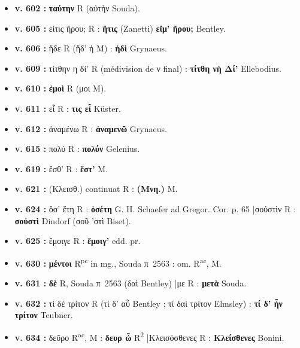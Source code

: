 \documentclass[10pt, a4paper, twoside]{book}
\renewcommand{\_}{\origunderscore\penalty0\relax}
\providecommand{\lecon}[1]{\textbf{#1}}
\providecommand{\expo}[1]{\textsuperscript{#1}}
\providecommand{\Rac}{R\expo{ac}}
\providecommand{\Rpc}{R\expo{pc}}
\providecommand{\Rdeux}{R\expo{2}}
\providecommand{\Mon}{M}
\providecommand{\espApp}{\hspace{0.5em}|\hspace{0.5em}}
\begin{document}
\begin{itemize}
\begin{itemize}
    \item \textbf{v. 602 :} \lecon{ταύτην} R (αὐτὴν Souda).
    \item \textbf{v. 605 :} εἰτις ἤρου; R : \lecon{ἥτις} (Zanetti) \lecon{εἴμ' ἤρου;} Bentley.
    \item \textbf{v. 606 :} ἥδε R (ἥδ' ἡ \Mon{}) : \lecon{ἡδὶ} Grynaeus.
    \item \textbf{v. 609 :} τίτθην η δί' R (médivision de ν final) : \lecon{τίτθη νὴ Δί'} Ellebodius.
    \item \textbf{v. 610 :} \lecon{ἐμοὶ} R (μοι \Mon{}).
    \item \textbf{v. 611 :} εἶ R : \lecon{τις εἶ} Küster.
    \item \textbf{v. 612 :} ἀναμένω R : \lecon{ἀναμενῶ} Grynaeus.
    \item \textbf{v. 615 :} πολύ R : \lecon{πολύν} Gelenius.
    \item \textbf{v. 619 :} ἔσθ' R : \lecon{ἔστ'} \Mon{}.
    \item \textbf{v. 621 :} (Κλεισθ.) continuat R : \lecon{(Μνη.)} \Mon{}.
    \item \textbf{v. 624 :} ὅσ' ἔτη R : \lecon{ὁσέτη} G. H. Schaefer ad Gregor. Cor. p. 65 \espApp σοὐστὶν R : \lecon{σοὐστὶ} Dindorf (σοῦ 'στὶ Biset).
    \item \textbf{v. 625 :} ἔμοιγε R : \lecon{ἔμοιγ'} edd. pr.
    \item \textbf{v. 630 :} \lecon{μέντοι} \Rpc{} in mg., Souda π~2563 : om. \Rac{}, \Mon{}.
    \item \textbf{v. 631 :} \lecon{δὲ} R, Souda π~2563 (δαὶ Bentley) \espApp με R : \lecon{μετὰ} Souda.
    \item \textbf{v. 632 :} τί δὲ τρίτον R (τί δ' αὖ Bentley ; τί δαὶ τρίτον Elmsley) : \lecon{τί δ' ἦν τρίτον} Teubner.
    \item \textbf{v. 634 :} δεῦρο \Rac{}, \Mon{} : \lecon{δευρ ὦ} \Rdeux{} \espApp Κλεισόσθενες R : \lecon{Κλείσθενες} Bonini.
  \end{itemize}
\end{itemize}
\end{document}
